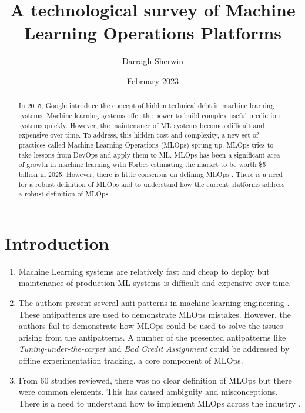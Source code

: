 \documentclass[12pt, a4paper]{article}
\title{A technological survey of Machine Learning Operations Platforms}
\author{Darragh Sherwin}
\date{February 2023}
\begin{document}
\maketitle
\begin{abstract}
In 2015, Google introduce the concept of hidden technical debt in machine learning systems\autocite{sculleyHiddenTechnicalDebt2015}. Machine learning systems offer the power to build complex useful prediction systems quickly. However, the maintenance of ML systems becomes difficult and expensive over time. To address, this hidden cost and complexity, a new set of practices called Machine Learning Operations (MLOps) sprung up. MLOps tries to take lessons from DevOps and apply them to ML. 
\linebreak
MLOps has been a significant area of growth in machine learning with Forbes estimating the market to be worth \$5 billion in 2025. However, there is little consensus on defining MLOps \autocite{mboweniSystematicReviewMachine2022}.
There is a need for a robust definition of MLOps and to understand how the current platforms address a robust definition of MLOps.


\end{abstract}

\section{Introduction}


\begin{enumerate}

\item Machine Learning systems are relatively fast and cheap to deploy but maintenance of production ML systems is difficult and expensive over time.  \autocite{sculleyHiddenTechnicalDebt2015}

\item The authors present several anti-patterns in machine learning engineering \autocite{muralidharUsingAntiPatternsAvoid2021}. These antipatterns are used to demonstrate MLOps mistakes. However, the authors fail to demonstrate how MLOps could be used to solve the issues arising from the antipatterns. A number of the presented antipatterns like \textit{Tuning-under-the-carpet} and \textit{Bad Credit Assignment} could be addressed by offline experimentation tracking, a core component of MLOps.

\item From 60 studies reviewed, there was no clear definition of MLOps but there were common elements. This has caused ambiguity and misconceptions. There is a need to understand how to implement MLOps across the industry \autocite{mboweniSystematicReviewMachine2022}. 

\end{enumerate}

\printbibliography
\end{document}
